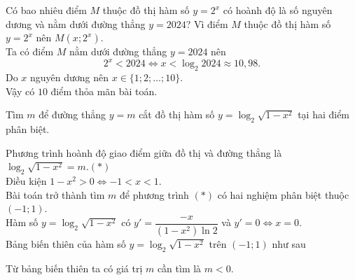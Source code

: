 \begin{bt}%
Có bao nhiêu điểm $M$ thuộc đồ thị hàm số $y=2^x$ có hoành độ là số nguyên dương và nằm dưới đường thẳng $y=2024$?
\loigiai
{Vì điểm $M$ thuộc đồ thị hàm số $y=2^x$ nên $M\left(x;2^x\right)$.\\
Ta có điểm $M$ nằm dưới đường thẳng $y=2024$ nên \[2^x<2024\Leftrightarrow x<\log_2 2024\approx 10{,}98.\]
Do $x$ nguyên dương nên $x\in\{1;2;\ldots;10\}$.\\
Vậy có $10$ điểm thỏa mãn bài toán.
}
\end{bt}

\begin{bt}%
Tìm $m$ để đường thẳng $y=m$ cắt đồ thị hàm số $y=\log_2\sqrt{1-x^2}$ tại hai điểm phân biệt.
\loigiai
{Phương trình hoành độ giao điểm giữa đồ thị và đường thẳng là $\log_2\sqrt{1-x^2}=m$.\quad $(*)$\\
Điều kiện $1-x^2>0\Leftrightarrow -1<x<1$.\\
Bài toán trở thành tìm $m$ để phương trình $(*)$ có hai nghiệm phân biệt thuộc $(-1;1)$.\\
Hàm số $y=\log_2\sqrt{1-x^2}$ có $y'=\dfrac{-x}{(1-x^2)\ln 2}$ và $y'=0\Leftrightarrow x=0$.\\
Bảng biến thiên của hàm số $y=\log_2\sqrt{1-x^2}$ trên $(-1;1)$ như sau
\begin{center}
\end{center}
Từ bảng biến thiên ta có giá trị $m$ cần tìm là $m<0$.
}
\end{bt}

